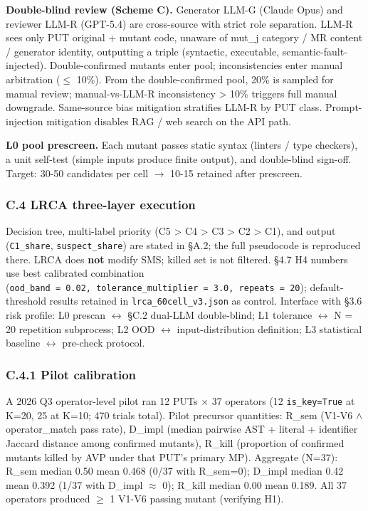 \documentclass[review,12pt,authoryear]{elsarticle}
\begin{document}
\textbf{Double-blind review (Scheme C).} Generator LLM-G (Claude Opus)
and reviewer LLM-R (GPT-5.4) are cross-source with strict role
separation. LLM-R sees only PUT original + mutant code, unaware of
mut\_j category / MR content / generator identity, outputting a triple
(syntactic, executable, semantic-fault-injected). Double-confirmed
mutants enter pool; inconsistencies enter manual arbitration ($\leq$ 10\%).
From the double-confirmed pool, 20\% is sampled for manual review;
manual-vs-LLM-R inconsistency \textgreater{} 10\% triggers full manual
downgrade. Same-source bias mitigation stratifies LLM-R by PUT class.
Prompt-injection mitigation disables RAG / web search on the API path.

\textbf{L0 pool prescreen.} Each mutant passes static syntax (linters /
type checkers), a unit self-test (simple inputs produce finite output),
and double-blind sign-off. Target: 30-50 candidates per cell $\to$ 10-15
retained after prescreen.

\subsubsection{C.4 LRCA three-layer execution}\label{c.4-lrca-three-layer-execution-full}

Decision tree, multi-label priority (C5 \textgreater{} C4 \textgreater{}
C3 \textgreater{} C2 \textgreater{} C1), and output (\texttt{C1\_share},
\texttt{suspect\_share}) are stated in §A.2; the full pseudocode is
reproduced there. LRCA does \textbf{not} modify SMS; killed set is not
filtered. §4.7 H4 numbers use best calibrated combination
(\texttt{ood\_band\ =\ 0.02,\ tolerance\_multiplier\ =\ 3.0,\ repeats\ =\ 20});
default-threshold results retained in \texttt{lrca\_60cell\_v3.json} as
control. Interface with §3.6 risk profile: L0 prescan $\leftrightarrow$ §C.2 dual-LLM
double-blind; L1 tolerance $\leftrightarrow$ N = 20 repetition subprocess; L2 OOD $\leftrightarrow$
input-distribution definition; L3 statistical baseline $\leftrightarrow$ pre-check
protocol.

\subsubsection{C.4.1 Pilot calibration}\label{c.4.1-pilot-calibration-37-operators-k-1020}

A 2026 Q3 operator-level pilot ran 12 PUTs $\times$ 37 operators (12
\texttt{is\_key=True} at K=20, 25 at K=10; 470 trials total). Pilot
precursor quantities: R\_sem (V1-V6 $\wedge$ operator\_match pass rate),
D\_impl (median pairwise AST + literal + identifier Jaccard distance
among confirmed mutants), R\_kill (proportion of confirmed mutants
killed by AVP under that PUT's primary MP). Aggregate (N=37): R\_sem
median 0.50 mean 0.468 (0/37 with R\_sem=0); D\_impl median 0.42 mean
0.392 (1/37 with D\_impl $\approx$ 0); R\_kill median 0.00 mean 0.189. All 37
operators produced $\geq$ 1 V1-V6 passing mutant (verifying H1).
\end{document}
